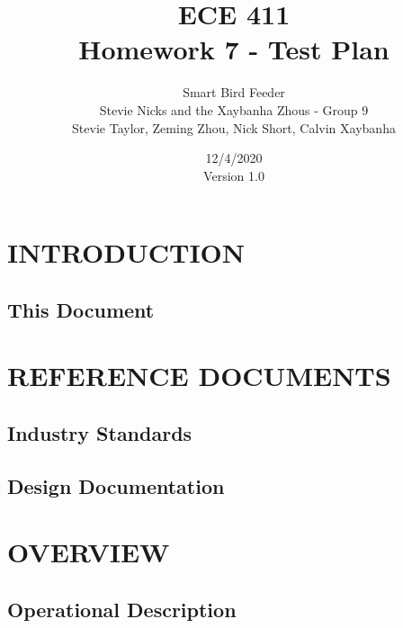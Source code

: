 
\title{ECE 411 \\ Homework 7 - Test Plan}
\date{12/4/2020\\Version 1.0}
\author{Smart Bird Feeder \\Stevie Nicks and the Xaybanha Zhous - Group 9\\Stevie Taylor, Zeming Zhou, Nick Short, Calvin Xaybanha}


	\vspace{0.3\baselineskip} %
	\maketitle
	\newpage
	
	\tableofcontents
	\newpage
	
	\lhead{} 
	
	\section{INTRODUCTION}
	\subsection{This Document}
	\newpage
	\section{REFERENCE DOCUMENTS}
	\subsection{Industry Standards}
	
	\subsection{Design Documentation}	
	
	\newpage
	\section{OVERVIEW}
	\subsection{Operational Description}
	
